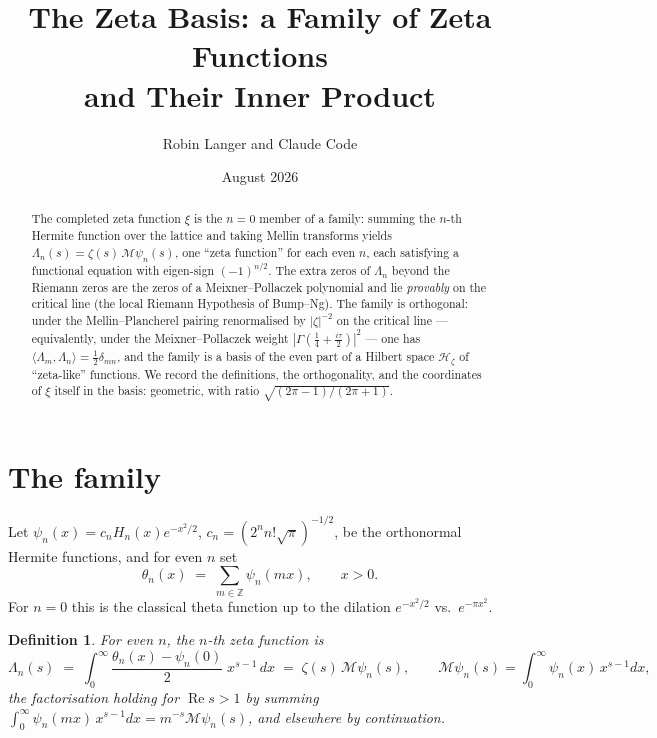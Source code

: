 \documentclass[11pt]{article}
\title{The Zeta Basis: a Family of Zeta Functions\\ and Their Inner Product}
\author{Robin Langer and Claude Code}
\date{August 2026}
\newtheorem{definition}[theorem]{Definition}
\theoremstyle{remark}
\newcommand{\Z}{\mathbb{Z}}
\newcommand{\M}{\mathcal{M}}
\newcommand{\Hz}{\mathcal{H}_\zeta}
\begin{document}
\maketitle

\begin{abstract}
The completed zeta function $\xi$ is the $n = 0$ member of a family: summing the $n$-th Hermite function over the lattice and taking Mellin transforms yields $\Lambda_n(s) = \zeta(s)\, \M\psi_n(s)$, one ``zeta function'' for each even $n$, each satisfying a functional equation with eigen-sign $(-1)^{n/2}$. The extra zeros of $\Lambda_n$ beyond the Riemann zeros are the zeros of a Meixner--Pollaczek polynomial and lie \emph{provably} on the critical line (the local Riemann Hypothesis of Bump--Ng). The family is orthogonal: under the Mellin--Plancherel pairing renormalised by $|\zeta|^{-2}$ on the critical line --- equivalently, under the Meixner--Pollaczek weight $|\Gamma(\tfrac14 + \tfrac{i\tau}{2})|^2$ --- one has $\langle \Lambda_m, \Lambda_n \rangle = \tfrac12 \delta_{mn}$, and the family is a basis of the even part of a Hilbert space $\Hz$ of ``zeta-like'' functions. We record the definitions, the orthogonality, and the coordinates of $\xi$ itself in the basis: geometric, with ratio $\sqrt{(2\pi-1)/(2\pi+1)}$.
\end{abstract}

\section{The family}

Let $\psi_n(x) = c_n H_n(x) e^{-x^2/2}$, $c_n = (2^n n! \sqrt{\pi})^{-1/2}$, be the orthonormal Hermite functions, and for even $n$ set
\[
\theta_n(x) \;=\; \sum_{m \in \Z} \psi_n(mx), \qquad x > 0.
\]
For $n = 0$ this is the classical theta function up to the dilation $e^{-x^2/2}$ vs.\ $e^{-\pi x^2}$.

\begin{definition}
For even $n$, the $n$-th zeta function is
\begin{equation}
\Lambda_n(s) \;=\; \int_0^\infty \frac{\theta_n(x) - \psi_n(0)}{2}\; x^{s-1}\, dx
\;=\; \zeta(s)\, \M\psi_n(s),
\qquad \M\psi_n(s) = \int_0^\infty \psi_n(x)\, x^{s-1} dx,
\label{eq:family}
\end{equation}
the factorisation holding for $\operatorname{Re} s > 1$ by summing $\int_0^\infty \psi_n(mx)\,x^{s-1}dx = m^{-s}\M\psi_n(s)$, and elsewhere by continuation.
\end{definition}
\end{document}
